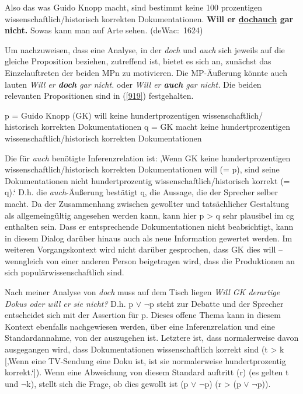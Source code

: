 {\begin{exe}
	\ex\label{918}

	Also das was Guido Knopp macht, sind bestimmt keine 100 prozentigen wissenschaftlich\slash historisch korrekten Dokumentationen. \textbf{Will er 					\ul{doch\linebreak auch} gar nicht.} Sowas kann man auf Arte sehen. 
	\hfill\hbox{(deWac: 1624)}
\end{exe}
Um nachzuweisen, dass eine Analyse, in der \textit{doch} und \textit{auch} sich jeweils auf die gleiche Proposition beziehen, zutreffend ist, bietet es sich an, zunächst das Ein\-zelauftreten der beiden MPn zu motivieren. Die MP-Äußerung könnte auch lauten \textit{Will er \textbf{doch} gar nicht.} oder \textit{Will er \textbf{auch} gar nicht.} Die beiden relevanten Propositionen sind in (\ref{919}) festgehalten.
	
\begin{exe}
	\ex\label{919} 
		\begin{xlist}	
			\ex\label{919a} p = Guido Knopp (GK) will keine hundertprozentigen wissenschaftlich/ historisch korrekten Dokumentationen
			\ex\label{919b} q = GK macht keine hundertprozentigen wissenschaftlich\slash historisch korrekten Dokumentationen
			\hfill\hbox{\citet[42]{Helbig1981}}
		\end{xlist}
\end{exe}
Die für \textit{auch} benötigte Inferenzrelation ist: ‚Wenn GK keine hundertprozentigen wissenschaftlich\slash historisch korrekten Dokumentationen will (= p), sind seine Dokumentationen nicht hundertprozentig wissenschaftlich\slash historisch korrekt (= q).‘ D.h. die \textit{auch}-Äußerung bestätigt q, die Aussage, die der Sprecher selber macht. Da der Zusammenhang zwischen gewollter und tatsächlicher Gestaltung als allgemeingültig angesehen werden kann, kann hier p > q sehr plausibel im cg enthalten sein. Dass er entsprechende Dokumentationen nicht beabsichtigt, kann in diesem Dialog darüber hinaus auch als neue Information gewertet werden. Im weiteren Vorgangskontext wird nicht darüber gesprochen, dass GK dies will -- wenngleich von einer anderen Person beigetragen wird, dass die Produktionen an sich populärwissenschaftlich sind.

Nach meiner Analyse von \textit{doch} muss auf dem Tisch liegen \textit{Will GK derartige Dokus oder will er sie nicht?} D.h. p $\vee$ $\neg$p steht zur Debatte und der Sprecher entscheidet sich mit der Assertion für p. Dieses offene Thema kann in diesem Kontext ebenfalls nachgewiesen werden, über eine Inferenzrelation  und eine Standardannahme, von der auszugehen ist. Letztere ist, dass normalerweise davon ausgegangen wird, dass Dokumentationen wissenschaftlich korrekt sind (t > k [‚Wenn eine TV-Sendung eine Doku ist, ist sie normalerweise hundertprozentig korrekt.‘]). Wenn eine Abweichung von diesem Standard auftritt (r) (es gelten t und $\neg$k), stellt sich die Frage, ob dies gewollt ist (p $\vee$ $\neg$p) (r > (p $\vee$ $\neg$p)).

}
